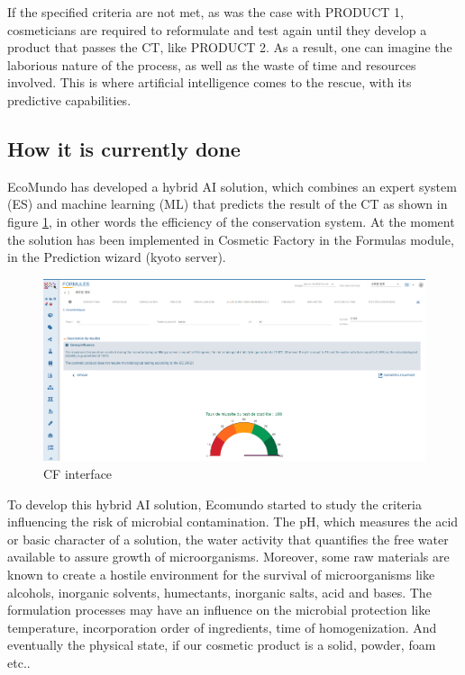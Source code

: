 \documentclass[a4paper,12pt,twoside]{report}
\begin{document}
If the specified criteria are not met, as was the case with PRODUCT 1, cosmeticians are required to reformulate and test again until they develop a product that passes the CT, like PRODUCT 2. As a result, one can imagine the laborious nature of the process, as well as the waste of time and resources involved. This is where artificial intelligence comes to the rescue, with its predictive capabilities.

\subsection{How it is currently done}
EcoMundo has developed a hybrid AI solution, which combines an expert system (ES) and machine learning (ML) that predicts the result of the CT as shown in figure \ref{cfinterface}, in other words the efficiency of the conservation system. 
At the moment the solution has been implemented in Cosmetic Factory in the Formulas module, in the Prediction wizard (kyoto server).
\begin{figure}[H]
		\includegraphics[width=\textwidth]{images/kyoto}
	\caption[Cosmetic Factory Interface for CT]{CF interface}
	\label{cfinterface}
\end{figure}

To develop this hybrid AI solution, Ecomundo started to study the criteria influencing the risk of microbial contamination. The pH, which measures the acid or basic character of a solution, the water activity that quantifies the free water available to assure growth of microorganisms. Moreover, some raw materials are known to create a hostile environment for the survival of microorganisms like alcohols, inorganic solvents, humectants, inorganic salts, acid and bases. The formulation processes may have an influence on the microbial protection like temperature, incorporation order of ingredients, time of homogenization. And eventually the physical state, if our cosmetic product is a solid, powder, foam etc..
\end{document}
